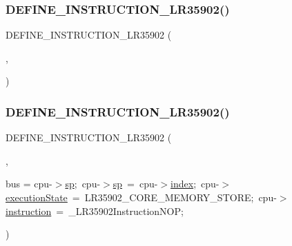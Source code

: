 \subsubsection{\texorpdfstring{D\+E\+F\+I\+N\+E\+\_\+\+I\+N\+S\+T\+R\+U\+C\+T\+I\+O\+N\+\_\+\+L\+R35902()}{DEFINE\_INSTRUCTION\_LR35902()}\hspace{0.1cm}{\footnotesize\ttfamily [2/20]}}
{\footnotesize\ttfamily D\+E\+F\+I\+N\+E\+\_\+\+I\+N\+S\+T\+R\+U\+C\+T\+I\+O\+N\+\_\+\+L\+R35902 (\begin{DoxyParamCaption}\item[{J\+P\+Finish}]{,  }\item[{\mbox{\hyperlink{isa-lr35902_8c_a2eb27369cb3dbac14564f95cd51effdf}{if}}(cpu-\/$>$\mbox{\hyperlink{isa-lr35902_8c_a9cc5e499f71726f3a653debd7bf9ccc7}{condition}}) \{ cpu-\/$>$pc=(cpu-\/$>$\mbox{\hyperlink{isa-lr35902_8c_a6163e7e073b87ad067db0a3b10da6be9}{bus}}$<$$<$ 8)$\vert$cpu-\/$>$\mbox{\hyperlink{isa-lr35902_8c_ac9ee548085af12859cb52a6c757cf73a}{index}};cpu-\/$>$memory.\+set\+Active\+Region(cpu, cpu-\/$>$pc);cpu-\/$>$\mbox{\hyperlink{isa-lr35902_8c_a087a53d4d283226a73c530dd2883d634}{execution\+State}}=L\+R35902\+\_\+\+C\+O\+R\+E\+\_\+\+S\+T\+A\+LL;\}}]{ }\end{DoxyParamCaption})}

\mbox{\label{isa-lr35902_8c_a3c4748156ae7b55eb0f50db8763627f0}} 
\subsubsection{\texorpdfstring{D\+E\+F\+I\+N\+E\+\_\+\+I\+N\+S\+T\+R\+U\+C\+T\+I\+O\+N\+\_\+\+L\+R35902()}{DEFINE\_INSTRUCTION\_LR35902()}\hspace{0.1cm}{\footnotesize\ttfamily [3/20]}}
{\footnotesize\ttfamily D\+E\+F\+I\+N\+E\+\_\+\+I\+N\+S\+T\+R\+U\+C\+T\+I\+O\+N\+\_\+\+L\+R35902 (\begin{DoxyParamCaption}\item[{C\+A\+L\+L\+Update\+S\+PL}]{,  }\item[{-\/-\/cpu-\/$>$\mbox{\hyperlink{isa-lr35902_8c_ac9ee548085af12859cb52a6c757cf73a}{index}};cpu-\/$>$}]{bus = {\ttfamily cpu-\/$>$\mbox{\hyperlink{isa-lr35902_8c_a2a917b9f439b612ee0161cab4c4d0568}{sp}};~cpu-\/$>$\mbox{\hyperlink{isa-lr35902_8c_a2a917b9f439b612ee0161cab4c4d0568}{sp}}~=~cpu-\/$>$\mbox{\hyperlink{isa-lr35902_8c_ac9ee548085af12859cb52a6c757cf73a}{index}};~cpu-\/$>$\mbox{\hyperlink{isa-lr35902_8c_a087a53d4d283226a73c530dd2883d634}{execution\+State}}~=~LR35902\+\_\+CORE\+\_\+MEMORY\+\_\+STORE;~cpu-\/$>$\mbox{\hyperlink{isa-lr35902_8c_a516462a0e821c76277faaeb2a1364b35}{instruction}}~=~\+\_\+LR35902InstructionNOP;} }\end{DoxyParamCaption})}

